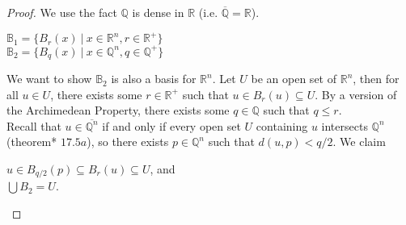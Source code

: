 \documentclass[11pt]{article}
\begin{document}
\begin{proof} We use the fact $\mathbb{Q}$ is dense in $\mathbb{R}$ (i.e. $\overline{\mathbb{Q}} = \mathbb{R}$).

\begin{center}
    $\mathbb{B}_1 = \{B_r(x) \ | \ x \in \mathbb{R}^n, r \in \mathbb{R}^+\}$\\
    $\mathbb{B}_2 = \{B_q(x) \ | \ x \in \mathbb{Q}^n, q \in \mathbb{Q}^+\}$
\end{center}

\noindent We want to show $\mathbb{B}_2$ is also a basis for $\mathbb{R}^n$. Let $U$ be an open set of $\mathbb{R}^n$, then for all $u \in U$, there exists some $r \in \mathbb{R}^+$ such that $u \in B_r(u) \subseteq
U$. By a version of the Archimedean Property, there exists some $q \in \mathbb{Q}$ such that $q \leq r$. \\

\noindent Recall that $u \in \overline{\mathbb{Q}^n}$ if and only if every open set $U$ containing $u$ intersects $\mathbb{Q}^n$ (theorem* $17.5a$), so there exists $p \in \mathbb{Q}^n$ such that $d(u,p)<q/2$. We claim

\begin{center}
    $u \in B_{q/2} (p) \subseteq B_r(u) \subseteq U$, and\\
    $\displaystyle \bigcup B_{2} = U$.
\end{center}

\end{proof}
\end{document}
